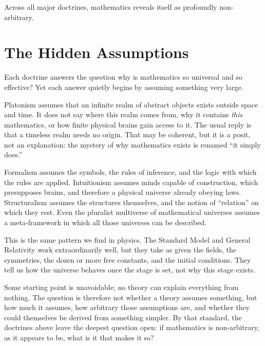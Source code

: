Across all major doctrines, mathematics reveals itself as profoundly non-arbitrary.



\section{The Hidden Assumptions}

Each doctrine answers the question why is mathematics so universal and so effective?
Yet each answer quietly begins by assuming something very large.

Platonism assumes that an infinite realm of abstract objects exists outside space and time.
It does not say where this realm comes from, why it contains \emph{this} mathematics, or how finite physical brains gain access to it.
The usual reply is that a timeless realm needs no origin.
That may be coherent, but it is a posit, not an explanation:
the mystery of why mathematics exists is renamed ``it simply does.''

Formalism assumes the symbols, the rules of inference, and the logic with which the rules are applied.
Intuitionism assumes minds capable of construction, which presupposes brains, and therefore a physical universe already obeying laws.
Structuralism assumes the structures themselves, and the notion of ``relation'' on which they rest.
Even the pluralist multiverse of mathematical universes assumes a meta-framework in which all those universes can be described.

This is the same pattern we find in physics.
The Standard Model and General Relativity work extraordinarily well, but they take as given the fields, the symmetries, the dozen or more free constants, and the initial conditions.
They tell us how the universe behaves once the stage is set, not why this stage exists.

Some starting point is unavoidable; no theory can explain everything from nothing.
The question is therefore not whether a theory assumes something, but how much it assumes, how arbitrary those assumptions are, and whether they could themselves be derived from something simpler.
By that standard, the doctrines above leave the deepest question open: if mathematics is non-arbitrary, as it appears to be, what is it that makes it so?
